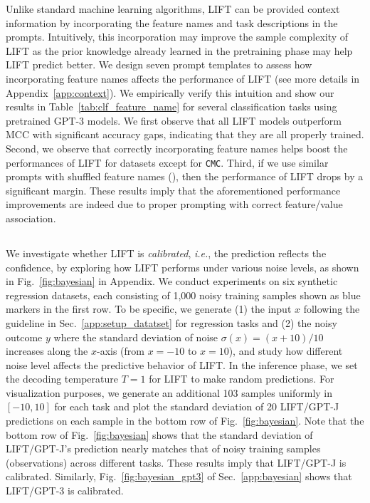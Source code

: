 Unlike standard machine learning algorithms, \textsc{LIFT} can be provided context information by incorporating the feature names and task descriptions in the prompts. Intuitively, this incorporation may improve the sample complexity of \textsc{LIFT} as the prior knowledge already learned in the pretraining phase may help \textsc{LIFT} predict better. We design seven prompt templates to assess how incorporating feature names affects the performance of \textsc{LIFT} (see more details in Appendix~\ref{app:context}).
We empirically verify this intuition and show our results in Table~\ref{tab:clf_feature_name} for several classification tasks using pretrained GPT-3 models. We first observe that all \textsc{LIFT} models outperform MCC with significant accuracy gaps, indicating that they are all properly trained. Second, we observe that correctly incorporating feature names helps boost the performances of \textsc{LIFT} for datasets except for \texttt{CMC}.
Third, if we use similar prompts with shuffled feature names (), then the performance of \textsc{LIFT} drops by a significant margin. These results imply that the aforementioned performance improvements are indeed due to proper prompting with correct feature/value association.

\subsection{}
\label{sec:Bayesian}

We investigate whether \textsc{LIFT} is \textit{calibrated}, \textit{i.e.}, the prediction reflects the confidence, by exploring how \textsc{LIFT} performs under various noise levels, as shown in 
Fig.~\ref{fig:bayesian} in Appendix. We conduct experiments on six synthetic regression datasets, each consisting of 1,000 noisy training samples shown as blue markers in the first row. To be specific, we generate (1) the input $x$ following the guideline in Sec.~\ref{app:setup_datatset} for regression tasks and (2) the noisy outcome $y$ where the standard deviation of noise $\sigma(x)=(x+10)/10$ increases along the $x$-axis (from $x=-10$ to $x=10$), and study how different noise level affects the predictive behavior of \textsc{LIFT}.
In the inference phase, we set the decoding temperature $T=1$ for \textsc{LIFT} to make random predictions. For visualization purposes, we generate an additional 103 samples uniformly in $[-10,10]$ for each task and plot the standard deviation of 20 \textsc{LIFT}/GPT-J predictions on each sample in the bottom row of Fig.~\ref{fig:bayesian}.  
Note that the bottom row of Fig.~\ref{fig:bayesian} shows that the standard deviation of \textsc{LIFT}/GPT-J's prediction nearly matches that of noisy training samples (observations) across different tasks. These results imply that \textsc{LIFT}/GPT-J is calibrated. Similarly, Fig.~\ref{fig:bayesian_gpt3} of Sec.~\ref{app:bayesian} shows that \textsc{LIFT}/GPT-3 is calibrated.

